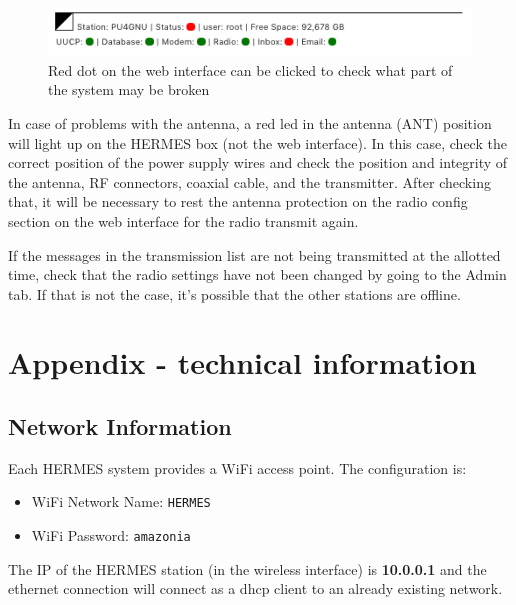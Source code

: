 \documentclass[11pt,a4paper]{article}
\begin{document}
\begin{figure}[H]
    \centering
    \includegraphics[width=0.8\columnwidth]{screenshots/frontend/en/status.png}
    	\caption{Red dot on the web interface can be clicked to check what part of the system may be broken}
    \label{fig:status}
\end{figure}

In case of problems with the antenna, a red led in the antenna (ANT) position will light up on the HERMES box (not the web interface). In this case, check the correct position of the power supply wires and check the position and integrity of the antenna, RF connectors, coaxial cable, and the transmitter. After checking that, it will be necessary to rest the antenna protection on the radio config section on the web interface for the radio transmit again. 

If the messages in the transmission list are not being transmitted at the allotted time, check that the radio settings have not been changed by going to the Admin tab. If that is not the case, it's possible that the other stations are offline.



\pagebreak
{}
\label{techinfo}
\section{Appendix - technical information}
\subsection{Network Information}
\label{apx_net_info}

Each HERMES system provides a WiFi access point. The configuration is:
\begin{itemize}
\item WiFi Network Name: \texttt{HERMES}
\item WiFi Password: \texttt{amazonia}
\end{itemize}

The IP of the HERMES station (in the wireless interface) is \textbf{10.0.0.1} and the ethernet connection will connect as a dhcp client to an already existing network. 

\end{document}
